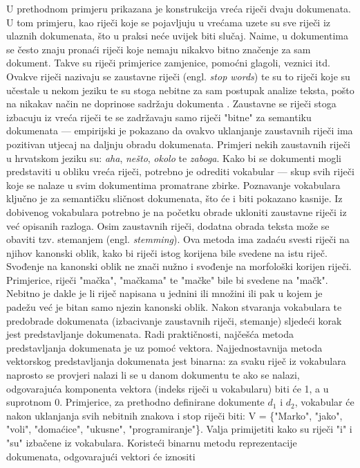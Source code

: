 \documentclass[times, utf8, zavrsni, numeric]{fer}
\begin{document}
U prethodnom primjeru prikazana je konstrukcija vreća riječi dvaju dokumenata. U tom primjeru, kao riječi koje se pojavljuju u vrećama uzete su sve riječi iz ulaznih dokumenata, što u praksi neće uvijek biti slučaj. Naime, u dokumentima se često znaju pronaći riječi koje nemaju nikakvo bitno značenje za sam dokument. Takve su riječi primjerice zamjenice, pomoćni glagoli, veznici itd. Ovakve riječi nazivaju se zaustavne riječi (engl. \textit{stop words}) te su to riječi koje su učestale u nekom jeziku te su stoga nebitne za sam postupak analize teksta, pošto na nikakav način ne doprinose sadržaju dokumenta \cite{allahyari2017}. Zaustavne se riječi stoga izbacuju iz vreća riječi te se zadržavaju samo riječi "bitne" za semantiku dokumenata — empirijski je pokazano da ovakvo uklanjanje zaustavnih riječi ima pozitivan utjecaj na daljnju obradu dokumenata. Primjeri nekih zaustavnih riječi u hrvatskom jeziku su: \textit{aha}, \textit{nešto}, \textit{okolo} te \textit{zaboga}.
Kako bi se dokumenti mogli predstaviti u obliku vreća riječi, potrebno je odrediti vokabular — skup svih riječi koje se nalaze u svim dokumentima promatrane zbirke. Poznavanje vokabulara ključno je za semantičku sličnost dokumenata, što će i biti pokazano kasnije. Iz dobivenog vokabulara potrebno je na početku obrade ukloniti zaustavne riječi iz već opisanih razloga. Osim zaustavnih riječi, dodatna obrada teksta može se obaviti tzv. stemanjem (engl. \textit{stemming}). Ova metoda ima zadaću svesti riječi na njihov kanonski oblik, kako bi riječi istog korijena bile svedene na istu riječ. Svođenje na kanonski oblik ne znači nužno i svođenje na morfološki korijen riječi. Primjerice, riječi "mačka", "mačkama" te "mačke" bile bi svedene na "mačk". Nebitno je dakle je li riječ napisana u jednini ili množini ili pak u kojem je padežu već je bitan samo njezin kanonski oblik.
Nakon stvaranja vokabulara te predobrade dokumenata (izbacivanje zaustavnih riječi, stemanje) sljedeći korak jest predstavljanje dokumenata. Radi praktičnosti, najčešća metoda predstavljanja dokumenata je uz pomoć vektora.
Najjednostavnija metoda vektorskog predstavljanja dokumenata jest binarna: za svaku riječ iz vokabulara naprosto se provjeri nalazi li se u danom dokumentu te ako se nalazi, odgovarajuća komponenta vektora (indeks riječi u vokabularu) biti će 1, a u suprotnom 0. Primjerice, za prethodno definirane dokumente $d_{1}$ i $d_{2}$, vokabular će nakon uklanjanja svih nebitnih znakova i stop riječi biti: V = \{"Marko", "jako", "voli", "domaćice", "ukusne", "programiranje"\}. Valja primijetiti kako su riječi "i" i "su" izbačene iz vokabulara. Koristeći binarnu metodu reprezentacije dokumenata, odgovarajući vektori će iznositi
\end{document}
